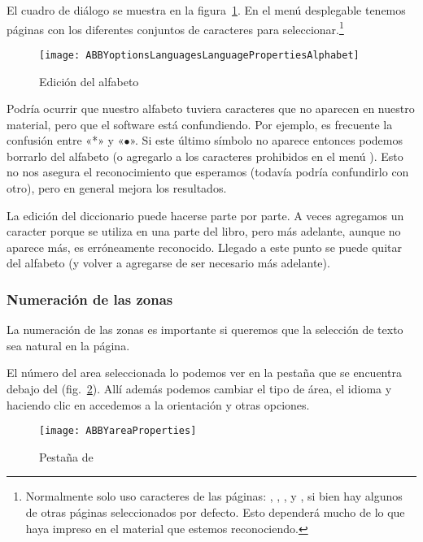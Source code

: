 \documentclass[%
	a5paper,
	10pt,
	twoside,
	openright,
	final,
]{memoir}
\begin{document}
	El cuadro de diálogo se muestra en la figura~\ref{fig:ABBYoptionsLanguagesLanguagePropertiesAlphabet}. En el menú desplegable  tenemos páginas con los diferentes conjuntos de caracteres para seleccionar.\footnote{Normalmente solo uso caracteres de las páginas: , , ,  y , si bien hay algunos de otras páginas seleccionados por defecto. Esto dependerá mucho de lo que haya impreso en el material que estemos reconociendo.}

	\begin{figure}
		\texttt{[image: ABBYoptionsLanguagesLanguagePropertiesAlphabet]}
		\caption{Edición del alfabeto\label{fig:ABBYoptionsLanguagesLanguagePropertiesAlphabet}}
	\end{figure}

	Podría ocurrir que nuestro alfabeto tuviera caracteres que no aparecen en nuestro material, pero que el software está confundiendo. Por ejemplo, es frecuente la confusión entre «*» y «$\bullet$». Si este último símbolo no aparece entonces podemos borrarlo del alfabeto (o agregarlo a los caracteres prohibidos en el menú ). Esto no nos asegura el reconocimiento que esperamos (todavía podría confundirlo con otro), pero en general mejora los resultados.

	La edición del diccionario puede hacerse parte por parte. A veces agregamos un caracter porque se utiliza en una parte del libro, pero más adelante, aunque no aparece más, es erróneamente reconocido. Llegado a este punto se puede quitar del alfabeto (y volver a agregarse de ser necesario más adelante).

	\subsubsection{Numeración de las zonas} La numeración de las zonas es importante si queremos que la selección de texto sea natural en la página.

	El número del area seleccionada lo podemos ver en la pestaña  que se encuentra debajo del  (fig.~\ref{fig:ABBYareaProperties}). Allí además podemos cambiar el tipo de área, el idioma y haciendo clic en \keys{\,\faCaretRight} accedemos a la orientación y otras opciones.

	\begin{figure}
		\centering
		\texttt{[image: ABBYareaProperties]}
		\caption[Pestaña Area Properties de \abby]{Pestaña  de \abby\label{fig:ABBYareaProperties}}
	\end{figure}
\end{document}
